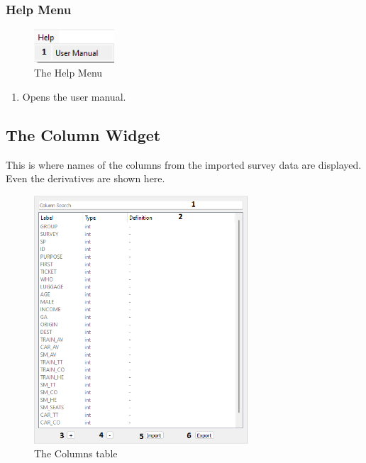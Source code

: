 \documentclass{article}
\begin{document}
\subsubsection{Help Menu}
\begin{figure}[H]%
  \centering
  \includegraphics[width=3cm]{docs/User Manual/img/Help menu.png}
  \caption{The Help Menu}
  \label{fig:helpmenu} 
\end{figure}
\begin{enumerate} [label=\textbf{\arabic*})]
    \item Opens the user manual.
\end{enumerate}
\newpage
\subsection{The Column Widget} \label{sec:columns}
This is where names of the columns from the imported survey data are displayed. Even the derivatives are shown here.
\begin{figure}[H]%
  \centering
  \includegraphics[width=8cm]{docs/User Manual/img/ColumnWidget.png}
  \caption{The Columns table}
  \label{fig:columns} 
\end{figure}
\end{document}
